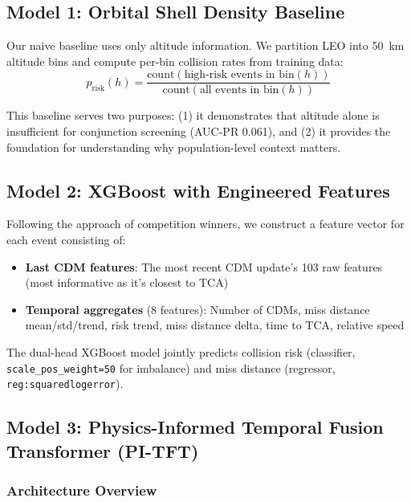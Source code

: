 \documentclass{article}
\begin{document}
\subsection{Model 1: Orbital Shell Density Baseline}
\label{sec:baseline}

Our naive baseline uses only altitude information. We partition LEO into 50~km altitude bins and compute per-bin collision rates from training data:
\begin{equation}
p_{\text{risk}}(h) = \frac{\text{count}(\text{high-risk events in bin}(h))}{\text{count}(\text{all events in bin}(h))}
\label{eq:baseline}
\end{equation}

This baseline serves two purposes: (1) it demonstrates that altitude alone is insufficient for conjunction screening (AUC-PR 0.061), and (2) it provides the foundation for understanding why population-level context matters.

\subsection{Model 2: XGBoost with Engineered Features}
\label{sec:xgboost}

Following the approach of competition winners, we construct a feature vector for each event consisting of:

\begin{itemize}
\item \textbf{Last CDM features}: The most recent CDM update's 103 raw features (most informative as it's closest to TCA)
\item \textbf{Temporal aggregates} (8 features): Number of CDMs, miss distance mean/std/trend, risk trend, miss distance delta, time to TCA, relative speed
\end{itemize}

The dual-head XGBoost model jointly predicts collision risk (classifier, \texttt{scale\_pos\_weight=50} for imbalance) and miss distance (regressor, \texttt{reg:squaredlogerror}).

\subsection{Model 3: Physics-Informed Temporal Fusion Transformer (PI-TFT)}
\label{sec:pitft}

\subsubsection{Architecture Overview}
\label{sec:pitft-arch}
\end{document}
